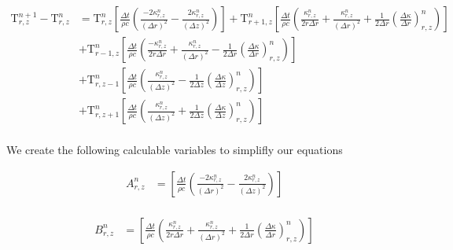 \documentclass[12pt]{article}
\begin{document}
		\begin{equation}
		\begin{aligned}
		\mathrm{T}^{n+1}_{r, z} - \mathrm{T}^{n}_{r, z} &=  \mathrm{T}^{n}_{r, z} \left [ \frac{\Delta t}{\rho c} \left (\frac{-2\kappa^n_{r, z}}{(\Delta r)^2} -\frac{2\kappa^n_{r, z}}{(\Delta z)^2} \right ) \right ] + \mathrm{T}^{n}_{r + 1, z} \left [ \frac{\Delta t}{\rho c} \left (\frac{\kappa^n_{r, z}}{2r\Delta r} + \frac{\kappa^n_{r, z}}{(\Delta r)^2} + \frac{1}{2\Delta r}\left(\frac{\Delta\kappa}{\Delta r}\right)^n_{r, z} \right ) \right ] \\
		&+ \mathrm{T}^{n}_{r - 1, z} \left [ \frac{\Delta t}{\rho c} \left (\frac{-\kappa^n_{r, z}}{2r\Delta r} + \frac{\kappa^n_{r, z}}{(\Delta r)^2} - \frac{1}{2\Delta r} \left(\frac{\Delta\kappa}{\Delta r}\right)^n_{r, z} \right )\right ] \\
		&+ \mathrm{T}^{n}_{r, z - 1} \left [ \frac{\Delta t}{\rho c}\left (\frac{\kappa^n_{r, z}}{(\Delta z)^2} - \frac{1}{2\Delta z}\left(\frac{\Delta\kappa}{\Delta z}\right)^n_{r, z} \right ) \right ] \\
		&+ \mathrm{T}^{n}_{r, z + 1} \left [ \frac{\Delta t}{\rho c}\left ( \frac{\kappa^n_{r, z}}{(\Delta z)^2} + \frac{1}{2\Delta z}\left(\frac{\Delta\kappa}{\Delta z}\right )^n_{r, z} \right ) \right ] \\
		\end{aligned}
		\end{equation}
		
    We create the following calculable variables to simplifly our equations

		\begin{equation}
		\begin{aligned}
		A^n_{r, z} &= \left [ \frac{\Delta t}{\rho c}\left (\frac{-2\kappa^n_{r, z}}{(\Delta r)^2} -\frac{2\kappa^n_{r, z}}{(\Delta z)^2} \right ) \right ] \\
		\end{aligned}
		\end{equation}
		
		\begin{equation}
		\begin{aligned}
		B^n_{r, z} &=  \left [ \frac{\Delta t}{\rho c}\left (\frac{\kappa^n_{r, z}}{2r\Delta r} + \frac{\kappa^n_{r, z}}{(\Delta r)^2} + \frac{1}{2\Delta r}\left(\frac{\Delta\kappa}{\Delta r}\right)^n_{r, z} \right ) \right ]
		\end{aligned}
		\end{equation}
		
\end{document}
